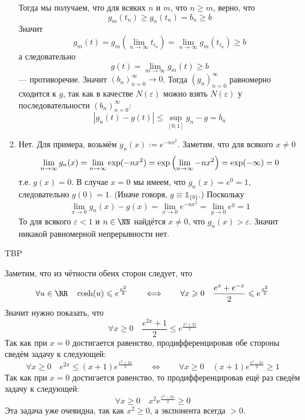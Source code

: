 \documentclass[12pt,a4paper]{article}
\begin{document}
\begin{enumproblem}
\begin{enumerate}
                Тогда мы получаем, что для всяких $n$ и $m$, что $n \geqslant m$, верно, что
                \[g_m(t_n) \geqslant g_n(t_n) = b_n \geqslant b\]
                Значит
                \[g_m(t) = g_m\left(\lim_{n \to \infty} t_{i_n}\right) = \lim_{n \to \infty} g_m(t_{i_n}) \geqslant b\]
                а следовательно
                \[g(t) = \lim_{m \to \infty} g_m(t) \geqslant b\]
                --- противоречие.
                Значит $(b_n)_{n=0}^\infty \to 0$. Тогда $(g_n)_{n=0}^\infty$ равномерно сходится к $g$, так как в качестве $N(\varepsilon)$ можно взять $N(\varepsilon)$ у последовательности $(b_n)_{n=0}^\infty$:
                \[|g_n(t) - g(t)| \leqslant \sup_{[0; 1]} g_n - g = b_n\]

            \item Нет. Для примера, возьмём $g_n(x) := e^{-n x^2}$. Заметим, что для всякого $x \neq 0$
                \[
                    \lim_{n \to \infty} g_n(x)
                    = \lim_{n \to \infty} \exp(-n x^2)
                    = \exp\left(\lim_{n \to \infty} -n x^2\right)
                    = \exp(-\infty)\\
                    = 0\\
                \]
                т.е. $g(x) = 0$. В случае $x = 0$ мы имеем, что $g_n(x) = e^0 = 1$, следовательно $g(0) = 1$. (Иначе говоря, $g \equiv \mathds{1}_{\{0\}}$.) Поскольку
                \[
                    \lim_{x \to 0} g_n(x) - g(x) = \lim_{x \to 0} e^{-nx^2} = \lim_{y \to 0} e^y = 1
                \]
                То для всякого $\varepsilon < 1$ и $n \in \NN$ найдётся $x \neq 0$, что $g_n(x) > \varepsilon$. Значит никакой равномерной непрерывности нет.
        \end{enumerate}
    \end{enumproblem}

    \begin{enumproblem}
        TBP
    \end{enumproblem}

    \begin{enumproblem}
        Заметим, что из чётности обеих сторон следует, что
        \[
            \forall u \in \RR\quad \cosh(u) \leqslant e^\frac{u^2}{2}
            \qquad \Longleftrightarrow\qquad
            \forall x \geqslant 0\quad \frac{e^x + e^{-x}}{2} \leqslant e^\frac{x^2}{2}
        \]
        Значит нужно показать, что
        \[\forall x \geqslant 0\quad \frac{e^{2x} + 1}{2} \leqslant e^\frac{x^2+2x}{2}\]
        Так как при $x = 0$ достигается равенство, продифференцировав обе стороны сведём задачу к следующей:
        \[
            \forall x \geqslant 0\quad e^{2x} \leqslant (x+1)e^\frac{x^2+2x}{2}
            \qquad \Longleftrightarrow\qquad
            \forall x \geqslant 0\quad (x+1)e^\frac{x^2-2x}{2} \geqslant 1
        \]
        Так как при $x = 0$ достигается равенство, то продифференцировав ещё раз сведём задачу к следующей:
        \[
            \forall x \geqslant 0\quad x^2 e^\frac{x^2-2x}{2} \geqslant 0
        \]
        Эта задача уже очевидна, так как $x^2 \geqslant 0$, а экспонента всегда $> 0$. 
    \end{enumproblem}
\end{document}
